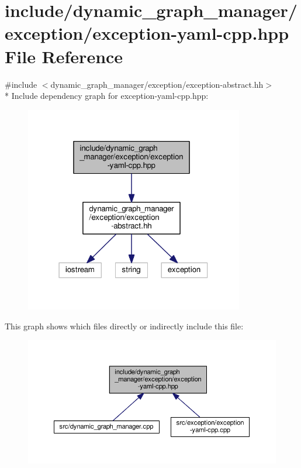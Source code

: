 \hypertarget{exception-yaml-cpp_8hpp}{}\section{include/dynamic\+\_\+graph\+\_\+manager/exception/exception-\/yaml-\/cpp.hpp File Reference}
\label{exception-yaml-cpp_8hpp}
{\ttfamily \#include $<$dynamic\+\_\+graph\+\_\+manager/exception/exception-\/abstract.\+hh$>$}\\*
Include dependency graph for exception-\/yaml-\/cpp.hpp\+:
\nopagebreak
\begin{figure}[H]
\begin{center}
\leavevmode
\includegraphics[width=271pt]{exception-yaml-cpp_8hpp__incl}
\end{center}
\end{figure}
This graph shows which files directly or indirectly include this file\+:
\nopagebreak
\begin{figure}[H]
\begin{center}
\leavevmode
\includegraphics[width=350pt]{exception-yaml-cpp_8hpp__dep__incl}
\end{center}
\end{figure}
